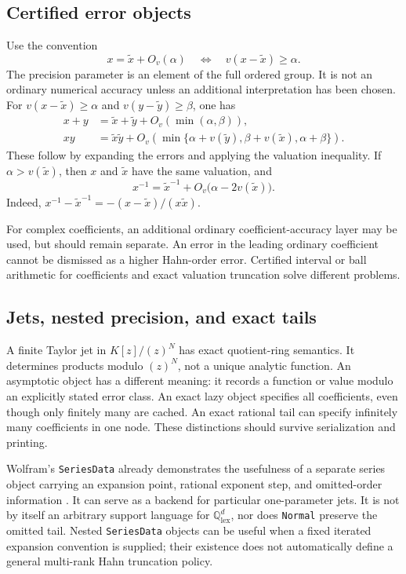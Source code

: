 \documentclass[11pt,letterpaper]{article}
\theoremstyle{definition}\newtheorem{definition}[theorem]{Definition}
\theoremstyle{remark}\newtheorem{remark}[theorem]{Remark}
\newcommand{\Q}{\mathbb Q}\newcommand{\N}{\mathbb N}\newcommand{\Z}{\mathbb Z}
\newcommand{\code}[1]{\texttt{#1}}
\numberwithin{equation}{section}\setcounter{tocdepth}{2}
\begin{document}
\subsection{Certified error objects}
Use the convention
\[
 x=\widetilde x+O_v(\alpha)\quad\Longleftrightarrow\quad
 v(x-\widetilde x)\ge\alpha.
\]
The precision parameter is an element of the full ordered group. It is not an ordinary numerical accuracy unless an additional interpretation has been chosen. For $v(x-\widetilde x)\ge\alpha$ and $v(y-\widetilde y)\ge\beta$, one has
\begin{align}
 x+y&=\widetilde x+\widetilde y+O_v(\min(\alpha,\beta)),\label{eq:addprecision}\\
 xy&=\widetilde x\widetilde y+
 O_v\!\left(\min\{\alpha+v(\widetilde y),\beta+v(\widetilde x),
 \alpha+\beta\}\right).\label{eq:mulprecision}
\end{align}
These follow by expanding the errors and applying the valuation inequality. If $\alpha>v(\widetilde x)$, then $x$ and $\widetilde x$ have the same valuation, and
\begin{equation}\label{eq:invprecision}
 x^{-1}=\widetilde x^{-1}+O_v\bigl(\alpha-2v(\widetilde x)\bigr).
\end{equation}
Indeed, $x^{-1}-\widetilde x^{-1}=-(x-\widetilde x)/(x\widetilde x)$.

For complex coefficients, an additional ordinary coefficient-accuracy layer may be used, but should remain separate. An error in the leading ordinary coefficient cannot be dismissed as a higher Hahn-order error. Certified interval or ball arithmetic for coefficients and exact valuation truncation solve different problems.

\subsection{Jets, nested precision, and exact tails}
A finite Taylor jet in $K[z]/(z)^N$ has exact quotient-ring semantics. It determines products modulo $(z)^N$, not a unique analytic function. An asymptotic object has a different meaning: it records a function or value modulo an explicitly stated error class. An exact lazy object specifies all coefficients, even though only finitely many are cached. An exact rational tail can specify infinitely many coefficients in one node. These distinctions should survive serialization and printing.

Wolfram's \code{SeriesData} already demonstrates the usefulness of a separate series object carrying an expansion point, rational exponent step, and omitted-order information \cite{WLSeries}. It can serve as a backend for particular one-parameter jets. It is not by itself an arbitrary support language for $\Q^d_{\mathrm{lex}}$, nor does \code{Normal} preserve the omitted tail. Nested \code{SeriesData} objects can be useful when a fixed iterated expansion convention is supplied; their existence does not automatically define a general multi-rank Hahn truncation policy.
\end{document}
